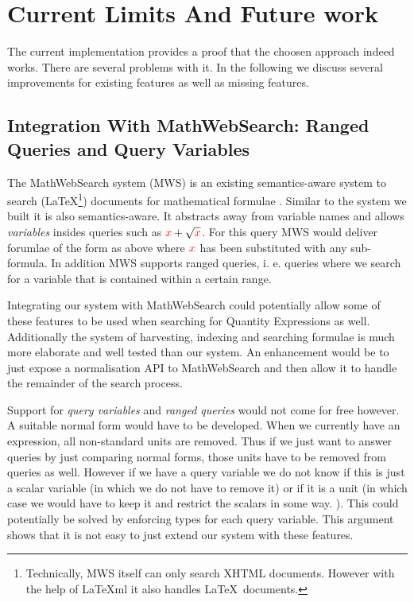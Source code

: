 \section{Current Limits And Future work}
\label{sec:future}

The current implementation provides a proof that the choosen approach indeed works. There are several problems with it. In the following we discuss several improvements for existing features as well as missing features.

\subsection{Integration With MathWebSearch: Ranged Queries and Query Variables}
The MathWebSearch system (MWS) is an existing semantics-aware system to search (\LaTeX\footnote{Technically, MWS itself can only search XHTML documents. However with the help of \LaTeX{}ml \cite{Miller:latexml:base} it also handles \LaTeX \ documents. }) documents for mathematical formulae \cite{HamKohPro:man14}. Similar to the system we built it is also semantics-aware. It abstracts away from variable names and allows \textit{variables} insides queries such as $ { \color{red} x} + \sqrt{\color{red} x}$. For this query MWS would deliver forumlae of the form as above where $ { \color{red} x} $ has been substituted with any sub-formula. In addition MWS supports ranged queries, i. e. queries where we search for a variable that is contained within a certain range.

Integrating our system with MathWebSearch could potentially allow some of these features to be used when searching for Quantity Expressions as well. Additionally the system of harvesting, indexing and searching formulae is much more elaborate and well tested than our system. An enhancement would be to just expose a normalisation API to MathWebSearch and then allow it to handle the remainder of the search process.

Support for \textit{query variables} and \textit{ranged queries} would not come for free however. A suitable normal form would have to be developed. When we currently have an expression, all non-standard units are removed. Thus if we just want to answer queries by just comparing normal forms, those units have to be removed from queries as well. However if we have a query variable we do not know if this is just a scalar variable (in which we do not have to remove it) or if it is a unit (in which case we would have to keep it and restrict the scalars in some way. ). This could potentially be solved by enforcing types for each query variable. This argument shows that it is not easy to just extend our system with these features.

